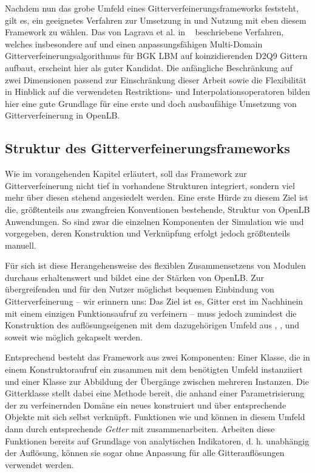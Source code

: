 \bigskip
Nachdem nun das grobe Umfeld eines Gitterverfeinerungsframeworks feststeht, gilt es, ein geeignetes Verfahren zur Umsetzung in und Nutzung mit eben diesem Framework zu wählen. Das von Lagrava et al. in ~\cite{Lagrava12} beschriebene Verfahren, welches insbesondere auf \cite{DupuisChopard03} und \cite{Filippova98} einen anpassungsfähigen Multi-Domain Gitterverfeinerungsalgorithmus für BGK LBM auf koinzidierenden D2Q9 Gittern aufbaut, erscheint hier als guter Kandidat. Die anfängliche Beschränkung auf zwei Dimensionen passend zur Einschränkung dieser Arbeit sowie die Flexibilität in Hinblick auf die verwendeten Restriktions- und Interpolationsoperatoren bilden hier eine gute Grundlage für eine erste und doch ausbaufähige Umsetzung von Gitterverfeinerung in OpenLB.

\newpage
\subsection{Struktur des Gitterverfeinerungsframeworks}

Wie im vorangehenden Kapitel erläutert, soll das Framework zur Gitterverfeinerung nicht tief in vorhandene Strukturen integriert, sondern viel mehr über diesen stehend angesiedelt werden. Eine erste Hürde zu diesem Ziel ist die, größtenteils aus zwangfreien Konventionen bestehende, Struktur von OpenLB Anwendungen. So sind zwar die einzelnen Komponenten der Simulation wie  und  vorgegeben, deren Konstruktion und Verknüpfung erfolgt jedoch größtenteils manuell.

Für sich ist diese Herangehensweise des flexiblen Zusammensetzens von Modulen durchaus erhaltenswert und bildet eine der Stärken von OpenLB. Zur übergreifenden und für den Nutzer möglichst bequemen Einbindung von Gitterverfeinerung -- wir erinnern uns: Das Ziel ist es, Gitter erst im Nachhinein mit einem einzigen Funktionsaufruf zu verfeinern -- muss jedoch zumindest die Konstruktion des auflösungseigenen  mit dem dazugehörigen Umfeld aus , ,  und  soweit wie möglich gekapselt werden.

\bigskip
Entsprechend besteht das Framework aus zwei Komponenten: Einer  Klasse, die in einem Konstruktoraufruf ein  zusammen mit dem benötigten Umfeld instanziiert und einer  Klasse zur Abbildung der Übergänge zwischen mehreren  Instanzen. Die Gitterklasse stellt dabei eine Methode  bereit, die anhand einer Parametrisierung der zu verfeinernden Domäne ein neues  konstruiert und über entsprechende  Objekte mit sich selbst verknüpft. Funktionen wie  und  können in diesem Umfeld dann durch entsprechende \emph{Getter} mit  zusammenarbeiten. Arbeiten diese Funktionen bereits auf Grundlage von analytischen Indikatoren, d. h. unabhängig der Auflösung, können sie sogar ohne Anpassung für alle Gitterauflösungen verwendet werden.

